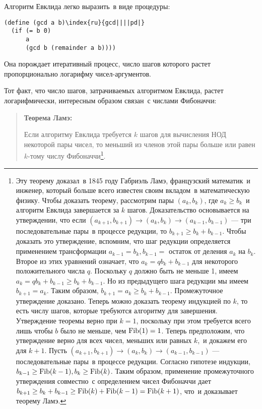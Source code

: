 Алгоритм Евклида легко выразить~в виде процедуры:

\begin{Verbatim}[fontsize=\small]
(define (gcd a b)\index{ru}{gcd||||pd|}
  (if (= b 0)
      a
      (gcd b (remainder a b))))
\end{Verbatim}
Она порождает итеративный процесс, число шагов которого растет
пропорционально логарифму чисел-аргументов.

Тот факт, что число шагов, затрачиваемых алгоритмом
Евклида, растет логарифмически, интересным образом связан~с числами 
Фибоначчи:

\begin{quote}
{\bf Теорема Ламэ:}

Если алгоритму Евклида требуется $k$ шагов
для вычисления НОД некоторой пары чисел, то меньший из членов этой
пары больше или равен $k$-тому числу Фибоначчи\footnote{Эту теорему
  доказал~в 1845 году Габриэль Ламэ,
французский математик~и инженер, который
больше всего известен своим вкладом~в математическую физику.  Чтобы
доказать теорему, рассмотрим пары $(a_k, b_k)$, где
$a_k \ge b_k$~и алгоритм Евклида завершается за
$k$ шагов.  Доказательство основывается на утверждении, что 
если $(a_{k+1}, b_{k+1}) \to (a_k, b_k) \to (a_{k-1},
b_{k-1})$ --- три последовательные пары~в процессе редукции, то
$b_{k+1} \ge b_k + b_{k-1}$.  Чтобы доказать это
утверждение, вспомним, что шаг редукции определяется применением
трансформации $a_{k-1} = b_k, b_{k-1} =$ остаток от деления 
$a_k$ на $b_k$.  Второе из этих уравнений
означает, что $a_k = qb_k + b_{k-1}$ для некоторого
положительного числа $q$.  Поскольку $q$ должно 
быть не меньше 1, имеем $a_k = qb_k + b_{k-1} \ge b_k +
b_{k-1}$.  Но из предыдущего шага редукции мы имеем
$b_{k+1} = a_k$. Таким образом, $b_{k+1} = a_k \ge b_k 
+ b_{k-1}$.  Промежуточное утверждение доказано.  Теперь можно
доказать теорему индукцией по $k$, то есть числу шагов,
которые требуются алгоритму для завершения.  Утверждение теоремы верно 
при $k = 1$, поскольку при этом требуется всего лишь чтобы
$b$ было не меньше, чем $\mathop{\rm Fib}(1) =
1$. Теперь предположим, что утверждение верно для всех чисел, меньших или 
равных $k$,~и докажем  его для $k + 1$. Пусть
$(a_{k+1}, b_{k+1}) \to (a_k, b_k) \to (a_{k-1}, b_{k-1})$
--- последовательные пары~в процессе редукции.  Согласно гипотезе
индукции, $b_{k-1} \ge \mathop{\rm Fib}(k - 1), b_k \ge
\mathop{\rm Fib} (k)$. Таким образом, применение промежуточного
утверждения совместно~с определением чисел Фибоначчи дает
$b_{k+1} \ge b_k + b_{k-1} \ge \mathop{\rm Fib}(k) + \mathop{\rm
Fib}(k-1) = \mathop{\rm Fib} (k+1)$, что~и доказывает теорему Ламэ.}.
\end{quote}

